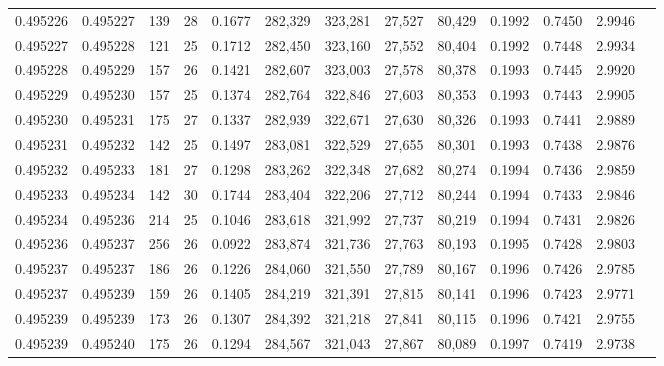 \begin{tabular}{rrrrrrrrrrrrr}
0.495226 & 0.495227 & 139 &  28 &                                     0.1677 & 282,329 & 323,281 &  27,527 &  80,429 & 0.1992 & 0.7450 & 2.9946 \\
0.495227 & 0.495228 & 121 &  25 &                                     0.1712 & 282,450 & 323,160 &  27,552 &  80,404 & 0.1992 & 0.7448 & 2.9934 \\
0.495228 & 0.495229 & 157 &  26 &                                     0.1421 & 282,607 & 323,003 &  27,578 &  80,378 & 0.1993 & 0.7445 & 2.9920 \\
0.495229 & 0.495230 & 157 &  25 &                                     0.1374 & 282,764 & 322,846 &  27,603 &  80,353 & 0.1993 & 0.7443 & 2.9905 \\
0.495230 & 0.495231 & 175 &  27 &                                     0.1337 & 282,939 & 322,671 &  27,630 &  80,326 & 0.1993 & 0.7441 & 2.9889 \\
0.495231 & 0.495232 & 142 &  25 &                                     0.1497 & 283,081 & 322,529 &  27,655 &  80,301 & 0.1993 & 0.7438 & 2.9876 \\
0.495232 & 0.495233 & 181 &  27 &                                     0.1298 & 283,262 & 322,348 &  27,682 &  80,274 & 0.1994 & 0.7436 & 2.9859 \\
0.495233 & 0.495234 & 142 &  30 &                                     0.1744 & 283,404 & 322,206 &  27,712 &  80,244 & 0.1994 & 0.7433 & 2.9846 \\
0.495234 & 0.495236 & 214 &  25 &                                     0.1046 & 283,618 & 321,992 &  27,737 &  80,219 & 0.1994 & 0.7431 & 2.9826 \\
0.495236 & 0.495237 & 256 &  26 &                                     0.0922 & 283,874 & 321,736 &  27,763 &  80,193 & 0.1995 & 0.7428 & 2.9803 \\
0.495237 & 0.495237 & 186 &  26 &                                     0.1226 & 284,060 & 321,550 &  27,789 &  80,167 & 0.1996 & 0.7426 & 2.9785 \\
0.495237 & 0.495239 & 159 &  26 &                                     0.1405 & 284,219 & 321,391 &  27,815 &  80,141 & 0.1996 & 0.7423 & 2.9771 \\
0.495239 & 0.495239 & 173 &  26 &                                     0.1307 & 284,392 & 321,218 &  27,841 &  80,115 & 0.1996 & 0.7421 & 2.9755 \\
0.495239 & 0.495240 & 175 &  26 &                                     0.1294 & 284,567 & 321,043 &  27,867 &  80,089 & 0.1997 & 0.7419 & 2.9738 \\

\end{tabular}
